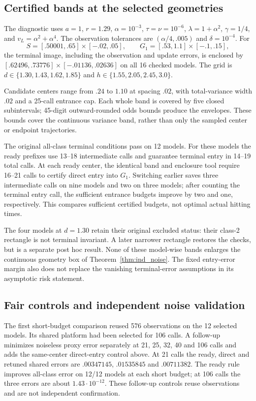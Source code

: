 \subsection{Certified bands at the selected geometries}
The diagnostic uses $a=1$, $r=1.29$, $\alpha=10^{-3}$,
$\tau=\nu=10^{-6}$, $\lambda=1+\alpha^2$, $\gamma=1/4$,
and $v_L=\alpha^2+\alpha^4$. The observation tolerances are
$(\alpha/4,.005)$ and $\delta=10^{-4}$.
For
\[
 S=[.50001,.65]\times[-.02,.05],
 \qquad G_1=[.53,1.1]\times[-.1,.15],
\]
the terminal image, including the observation and update errors,
is enclosed by
$[.62496,.73776]\times[-.01136,.02636]$ on all 16 checked models.
The grid is
$d\in\{1.30,1.43,1.62,1.85\}$ and
$h\in\{1.55,2.05,2.45,3.0\}$.

Candidate centers range from $.24$ to $1.10$ at spacing $.02$,
with total-variance width $.02$ and a 25-call entrance cap.
Each whole band is covered by five closed subintervals;
45-digit outward-rounded odds bounds produce the envelopes.
These bounds cover the continuous variance band, rather than
only the sampled center or endpoint trajectories.

The original all-class terminal conditions pass on 12 models.
For these models the ready prefixes use 13--18 intermediate calls
and guarantee terminal entry in 14--19 total calls. At each
ready center, the identical band and enclosure tool require
16--21 calls to certify direct entry into $G_1$.
Switching earlier saves three intermediate calls on nine models
and two on three models; after counting the terminal entry call,
the sufficient entrance budgets improve by two and one,
respectively. This compares sufficient certified budgets, not
optimal actual hitting times.

The four models at $d=1.30$ retain their original excluded status:
their class-2 rectangle is not terminal invariant. A later
narrower rectangle restores the checks, but is a separate
post hoc result. None of these model-wise bands enlarges the
continuous geometry box of Theorem~\ref{thm:ind_noise}.
The fixed entry-error margin also does not replace the vanishing
terminal-error assumptions in its asymptotic risk statement.

\subsection{Fair controls and independent noise validation}
The first short-budget comparison reused 576 observations on the
12 selected models. Its shared platform had been selected for
106 calls. A follow-up minimizes noiseless proxy error separately
at 21, 25, 32, 40 and 106 calls and adds the same-center direct-entry
control above. At 21 calls the ready, direct and retuned shared
errors are $.00347145$, $.01535845$ and $.00711382$.
The ready rule improves all-class error on 12/12 models at each
short budget; at 106 calls the three errors are about
$1.43\cdot10^{-12}$. These follow-up controls reuse observations
and are not independent confirmation.

